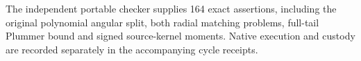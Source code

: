 The independent portable checker supplies 164 exact assertions, including
the original polynomial angular split, both radial matching problems,
full-tail Plummer bound and signed source-kernel moments. Native execution
and custody are recorded separately in the accompanying cycle receipts.


